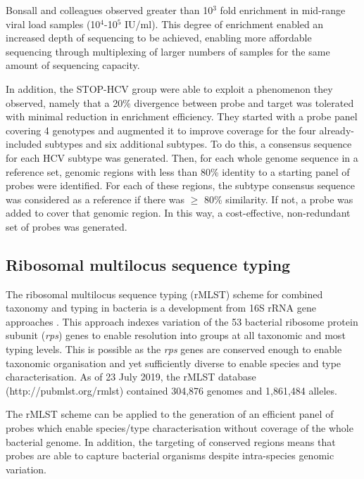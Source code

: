Bonsall and colleagues observed greater than 10$^{3}$ fold enrichment in mid-range viral load samples (10$^{4}$-10$^{5}$ IU/ml). This degree of enrichment enabled an increased depth of sequencing to be achieved, enabling more affordable sequencing through multiplexing of larger numbers of samples for the same amount of sequencing capacity.

In addition, the STOP-HCV group were able to exploit a phenomenon they observed, namely that a 20\% divergence between probe and target was tolerated with minimal reduction in enrichment efficiency. They started with a probe panel covering 4 genotypes and augmented it to improve coverage for the four already-included subtypes and six additional subtypes. To do this, a consensus sequence for each HCV subtype was generated. Then, for each whole genome sequence in a reference set, genomic regions with less than 80\% identity to a starting panel of probes were identified. For each of these regions, the subtype consensus sequence was considered as a reference if there was $\geq$ 80\% similarity. If not, a probe was added to cover that genomic region. In this way, a cost-effective, non-redundant set of probes was generated.

\subsection{Ribosomal multilocus sequence typing}
The ribosomal multilocus sequence typing (rMLST) scheme \parencite{Jolley2012} for combined taxonomy and typing in bacteria is a development from 16S rRNA gene approaches \parencite{Woese1987}. This approach indexes variation of the 53 bacterial ribosome protein subunit (\textit{rps}) genes to enable resolution into groups at all taxonomic and most typing levels. This is possible as the \textit{rps} genes are conserved enough to enable taxonomic organisation and yet sufficiently diverse to enable species and type characterisation. As of 23 July 2019, the rMLST database (http://pubmlst.org/rmlst) contained 304,876 genomes and 1,861,484 alleles. 

The rMLST scheme can be applied to the generation of an efficient panel of probes which enable species/type characterisation without coverage of the whole bacterial genome. In addition, the targeting of conserved regions means that probes are able to capture bacterial organisms despite intra-species genomic variation.

